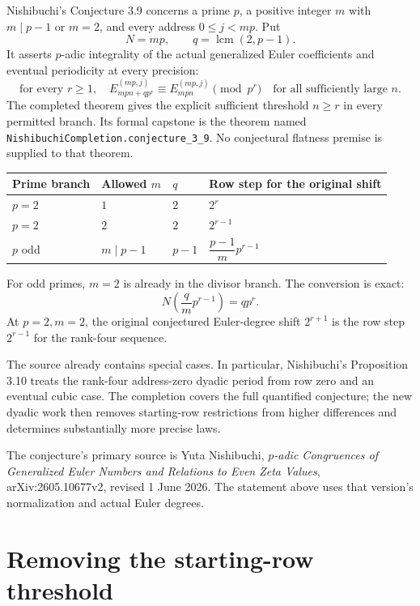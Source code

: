 Nishibuchi's Conjecture 3.9 concerns a prime $p$, a positive integer $m$ with
$m\mid p-1$ or $m=2$, and every address $0\le j<mp$. Put
\[
 N=mp, \qquad q=\operatorname{lcm}(2,p-1).
\]
It asserts $p$-adic integrality of the actual generalized Euler coefficients and
eventual periodicity at every precision:
\[
 \text{for every }r\ge1,\quad
 E_{mpn+qp^r}^{(mp,j)}\equiv E_{mpn}^{(mp,j)}\pmod {p^r}
 \quad\text{for all sufficiently large }n.
\]
The completed theorem gives the explicit sufficient threshold $n\ge r$ in
every permitted branch. Its formal capstone is the theorem named
\texttt{NishibuchiCompletion.conjecture\_3\_9}. No conjectural flatness premise
is supplied to that theorem.

\begin{center}
\begin{tabular}{llll}
\toprule
Prime branch & Allowed $m$ & $q$ & Row step for the original shift \\
\midrule
$p=2$ & $1$ & $2$ & $2^r$ \\
$p=2$ & $2$ & $2$ & $2^{r-1}$ \\
$p$ odd & $m\mid p-1$ & $p-1$ & $\dfrac{p-1}{m}p^{r-1}$ \\
\bottomrule
\end{tabular}
\end{center}

For odd primes, $m=2$ is already in the divisor branch. The conversion is exact:
\[
 N\left(\frac qm p^{r-1}\right)=qp^r.
\]
At $p=2,m=2$, the original conjectured Euler-degree shift $2^{r+1}$ is the row
step $2^{r-1}$ for the rank-four sequence.

The source already contains special cases. In particular, Nishibuchi's
Proposition 3.10 treats the rank-four address-zero dyadic period from row zero
and an eventual cubic case. The completion covers the full quantified
conjecture; the new dyadic work then removes starting-row restrictions from
higher differences and determines substantially more precise laws.

The conjecture's primary source is Yuta Nishibuchi, \emph{$p$-adic Congruences of
Generalized Euler Numbers and Relations to Even Zeta Values},
arXiv:2605.10677v2, revised 1 June 2026. The statement above uses that version's
normalization and actual Euler degrees.

\clearpage
\section{Removing the starting-row threshold}

